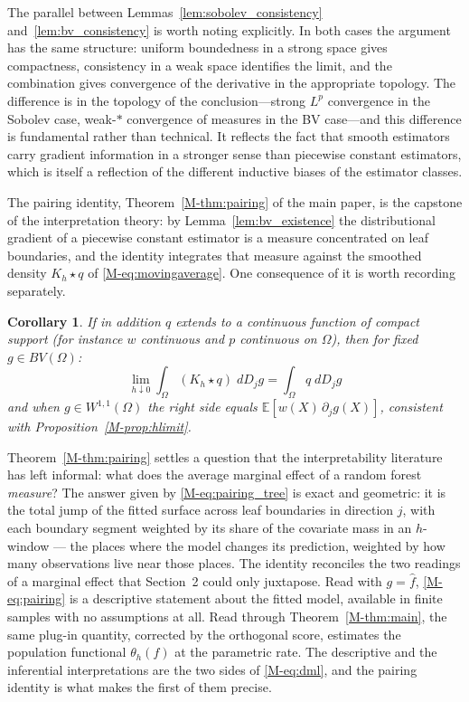 \documentclass[12pt,a4paper]{article}
\numberwithin{equation}{section}
\theoremstyle{plain}
\newtheorem{corollary}{Corollary}
\theoremstyle{definition}
\newcommand{\E}{\mathbb{E}}
\newcommand{\BV}{BV(\Omega)}
\begin{document}
	The parallel between Lemmas~\ref{lem:sobolev_consistency}
	and~\ref{lem:bv_consistency} is worth noting explicitly. In both cases the argument
	has the same structure: uniform boundedness in a strong space gives compactness,
	consistency in a weak space identifies the limit, and the combination gives
	convergence of the derivative in the appropriate topology. The difference is in the
	topology of the conclusion---strong $L^p$ convergence in the Sobolev case, weak-$*$
	convergence of measures in the BV case---and this difference is fundamental rather
	than technical. It reflects the fact that smooth estimators carry gradient
	information in a stronger sense than piecewise constant estimators, which is itself a
	reflection of the different inductive biases of the estimator classes.
	
	The pairing identity, Theorem~\ref{M-thm:pairing} of the main paper, is the
	capstone of the interpretation theory: by Lemma~\ref{lem:bv_existence} the
	distributional gradient of a piecewise constant estimator is a measure
	concentrated on leaf boundaries, and the identity integrates that measure
	against the smoothed density $K_h \star q$ of \eqref{M-eq:movingaverage}. One
	consequence of it is worth recording separately.

	\begin{corollary}
		\label{cor:pairing_limit}
		If in addition $q$ extends to a continuous function of compact support (for
		instance $w$ continuous and $p$ continuous on $\Omega$), then for fixed
		$g \in \BV$:
		\begin{equation}
			\lim_{h \downarrow 0} \int_\Omega (K_h \star q)\; dD_j g
			= \int_\Omega q\; dD_j g
		\end{equation}
		and when $g \in W^{1,1}(\Omega)$ the right side equals
		$\E[w(X)\, \partial_j g(X)]$, consistent with
		Proposition~\ref{M-prop:hlimit}.
	\end{corollary}
	
	Theorem~\ref{M-thm:pairing} settles a question that the interpretability literature
	has left informal: what does the average marginal effect of a random forest
	\emph{measure}? The answer given by \eqref{M-eq:pairing_tree} is exact and
	geometric: it is the total jump of the fitted surface across leaf boundaries in
	direction $j$, with each boundary segment weighted by its share of the covariate
	mass in an $h$-window --- the places where the model changes its prediction,
	weighted by how many observations live near those places. The identity reconciles
	the two readings of a marginal effect that Section~2 could only juxtapose. Read
	with $g = \hat{f}$, \eqref{M-eq:pairing} is a descriptive statement about the fitted
	model, available in finite samples with no assumptions at all. Read through
	Theorem~\ref{M-thm:main}, the same plug-in quantity, corrected by the orthogonal
	score, estimates the population functional $\theta_h(f)$ at the parametric rate.
	The descriptive and the inferential interpretations are the two sides of
	\eqref{M-eq:dml}, and the pairing identity is what makes the first of them precise.
	
\end{document}
